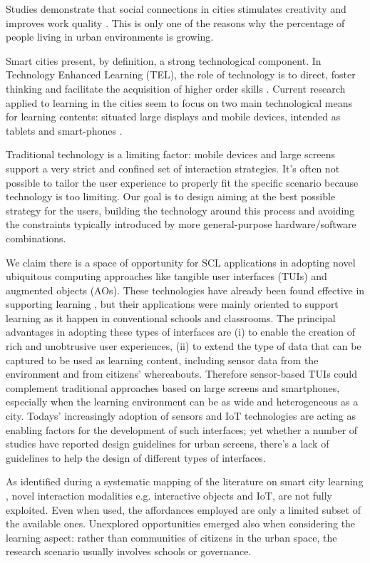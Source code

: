 Studies demonstrate that social connections in cities stimulates creativity and improves work quality \cite{florida_cities_2005}. This is only one of the reasons why the percentage of people living in urban environments is growing.

Smart cities present, by definition, a strong technological component.
In Technology Enhanced Learning (TEL), the role of technology is to direct, foster thinking and facilitate the acquisition of higher order skills \cite{goodyear_technologyenhanced_2010}.
Current research applied to learning in the cities seem to focus on two main technological means for learning contents: situated large displays and mobile devices, intended as tablets and smart-phones \cite{luff_mobility_1998}.

Traditional technology is a limiting factor: mobile devices and large screens support a very strict and confined set of interaction strategies. It's often not possible to tailor the user experience to properly fit the specific scenario because technology is too limiting.
Our goal is to design aiming at the best possible strategy for the users, building the technology around this process and avoiding the constraints typically introduced by more general-purpose hardware/software combinations.

We claim there is a space of opportunity for SCL applications in adopting novel ubiquitous computing approaches like tangible user interfaces (TUIs) and augmented objects (AOs). These technologies have already been found effective in supporting learning \cite{stanton_classroom_2001}, but their applications were mainly oriented to support learning as it happen in conventional schools and classrooms. The principal advantages in adopting these types of interfaces are (i) to enable the creation of rich and unobtrusive user experiences, (ii) to extend the type of data that can be captured to be used as learning content, including sensor data from the environment and from citizens' whereabouts. Therefore sensor-based TUIs could complement traditional approaches based on large screens and smartphones, especially when the learning environment can be as wide and heterogeneous as a city. Todays' increasingly adoption of sensors and IoT technologies are acting as enabling factors for the development of such interfaces; yet whether a number of studies have reported design guidelines for urban screens, there's a lack of guidelines to help the design of different types of interfaces.

As identified during a systematic mapping of the literature on smart city learning \cite{gianni_technologyenhanced_2016}, novel interaction modalities e.g. interactive objects and IoT, are not fully exploited. Even when used, the affordances employed are only a limited subset of the available ones. Unexplored opportunities emerged also when considering the learning aspect: rather than communities of citizens in the urban space, the research scenario usually involves schools or governance.

